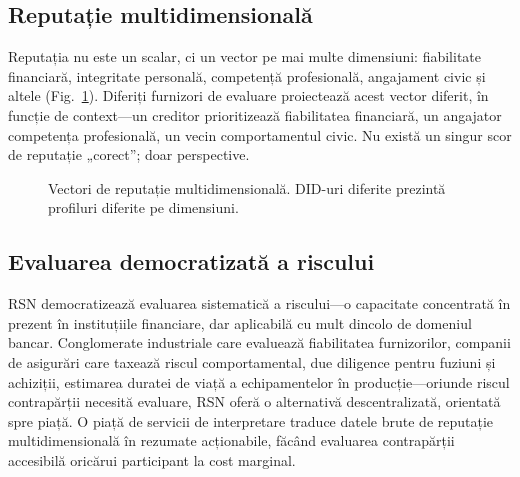 \documentclass[11pt,a4paper,twocolumn]{article}
\begin{document}
\subsection{Reputație multidimensională}

Reputația nu este un scalar, ci un vector pe mai multe dimensiuni: fiabilitate financiară, integritate personală, competență profesională, angajament civic și altele (Fig.~\ref{fig:reputation-radar}). Diferiți furnizori de evaluare proiectează acest vector diferit, în funcție de context---un creditor prioritizează fiabilitatea financiară, un angajator competența profesională, un vecin comportamentul civic. Nu există un singur scor de reputație „corect”; doar perspective.

\begin{figure}[ht]
\centering
{}
\caption{Vectori de reputație multidimensională. DID-uri diferite prezintă profiluri diferite pe dimensiuni.}
\label{fig:reputation-radar}
\end{figure}

\subsection{Evaluarea democratizată a riscului}

RSN democratizează evaluarea sistematică a riscului---o capacitate concentrată în prezent în instituțiile financiare, dar aplicabilă cu mult dincolo de domeniul bancar. Conglomerate industriale care evaluează fiabilitatea furnizorilor, companii de asigurări care taxează riscul comportamental, due diligence pentru fuziuni și achiziții, estimarea duratei de viață a echipamentelor în producție---oriunde riscul contrapărții necesită evaluare, RSN oferă o alternativă descentralizată, orientată spre piață. O piață de servicii de interpretare traduce datele brute de reputație multidimensională în rezumate acționabile, făcând evaluarea contrapărții accesibilă oricărui participant la cost marginal.
\end{document}
